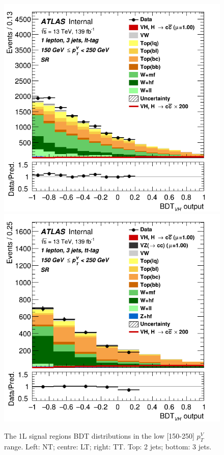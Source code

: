 \begin{figure}[h!]
\includegraphics[scale=0.2753]{Images/VH/SRsandTopCRs/Region_distmva_DSR_BMax250_L1_Y6051_TTypelt_T2_J3_BMin150_Prefit.png}
\includegraphics[scale=0.2753]{Images/VH/SRsandTopCRs/Region_distmva_DSR_BMax250_L1_Y6051_TTypett_T2_J3_BMin150_Prefit.png}
\caption{The 1L signal regions BDT distributions in the low [150-250] $p_T^V$ range. Left: NT; centre: LT; right: TT. Top: 2 jets; bottom: 3 jets.} 
\label{fig:SRslowptv}
\end{figure}

